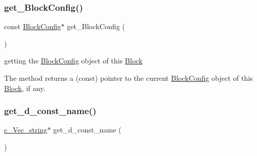 \subsubsection{\texorpdfstring{get\+\_\+\+Block\+Config()}{get\_BlockConfig()}}
{\footnotesize\ttfamily const \mbox{\hyperlink{class_s_m_spp__di__unipi__it_1_1_block_config}{Block\+Config}}$\ast$ get\+\_\+\+Block\+Config (\begin{DoxyParamCaption}\item[{void}]{ }\end{DoxyParamCaption})\hspace{0.3cm}{\ttfamily [inline]}}



getting the \mbox{\hyperlink{class_s_m_spp__di__unipi__it_1_1_block_config}{Block\+Config}} object of this \mbox{\hyperlink{class_s_m_spp__di__unipi__it_1_1_block}{Block}} 

The method returns a (const) pointer to the current \mbox{\hyperlink{class_s_m_spp__di__unipi__it_1_1_block_config}{Block\+Config}} object of this \mbox{\hyperlink{class_s_m_spp__di__unipi__it_1_1_block}{Block}}, if any. \mbox{\label{class_s_m_spp__di__unipi__it_1_1_block_a843ab91aeb7ad6839c8f3e5f131c928f}} 
\subsubsection{\texorpdfstring{get\+\_\+d\+\_\+const\+\_\+name()}{get\_d\_const\_name()}}
{\footnotesize\ttfamily \mbox{\hyperlink{group___s_m_s__types_ga4eb8b5e087882b48fc77ba2a18267301}{c\+\_\+\+Vec\+\_\+string}}$\ast$ get\+\_\+d\+\_\+const\+\_\+name (\begin{DoxyParamCaption}\item[{void}]{ }\end{DoxyParamCaption})\hspace{0.3cm}{\ttfamily [inline]}}



